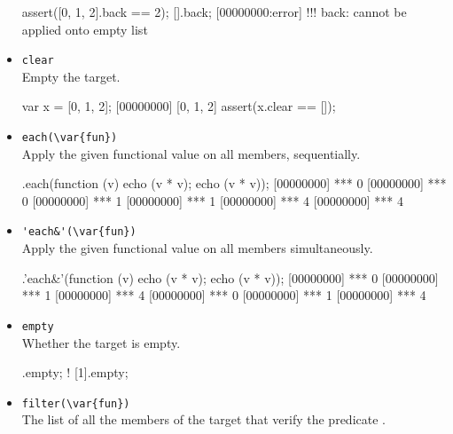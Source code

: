\begin{itemize}
\begin{urbiscript}[firstnumber=last]
assert([0, 1, 2].back == 2);
[].back;
[00000000:error] !!! back: cannot be applied onto empty list
\end{urbiscript}

\item \lstinline|clear|\\
  Empty the target.

\begin{urbiscript}[firstnumber=last]
var x = [0, 1, 2];
[00000000] [0, 1, 2]
assert(x.clear == []);
\end{urbiscript}

\item \lstinline|each(\var{fun})|\\
  Apply the given functional value  on all members,
  sequentially.

\begin{urbiscript}[firstnumber=last]
[0, 1, 2].each(function (v) {echo (v * v); echo (v * v)});
[00000000] *** 0
[00000000] *** 0
[00000000] *** 1
[00000000] *** 1
[00000000] *** 4
[00000000] *** 4
\end{urbiscript}

\item \lstinline|'each&'(\var{fun})|\\
Apply the given functional value on all members simultaneously.

\begin{urbiscript}[firstnumber=last]
[0, 1, 2].'each&'(function (v) {echo (v * v); echo (v * v)});
[00000000] *** 0
[00000000] *** 1
[00000000] *** 4
[00000000] *** 0
[00000000] *** 1
[00000000] *** 4
\end{urbiscript}

\item \lstinline|empty|\\
  Whether the target is empty.

\begin{urbiassert}[firstnumber=last]
[].empty;
! [1].empty;
\end{urbiassert}

\item \lstinline|filter(\var{fun})|\\
  The list of all the members of the target that verify the predicate
  .



\end{itemize}
